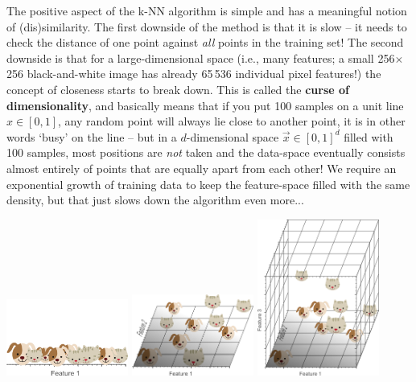 \documentclass{article}
\begin{document}
The positive aspect of the k-NN algorithm is simple and has a meaningful notion of (dis)similarity. The first downside of the method is that it is slow -- it needs to check the distance of one point against \textit{all} points in the training set! The second downside is that for a large-dimensional space (i.e., many features; a small 256$\times$256 black-and-white image has already 65\,536 individual pixel features!) the concept of closeness starts to break down. This is called the \textbf{curse of dimensionality}, and basically means that if you put 100 samples on a unit line $x\in[0,1]$, any random point will always lie close to another point, it is in other words `busy' on the line -- but in a $d$-dimensional space $\vec{x}\in[0,1]^d$ filled with 100 samples, most positions are \textit{not} taken and the data-space eventually consists almost entirely of points that are equally apart from each other! We require an exponential growth of training data to keep the feature-space filled with the same density, but that just slows down the algorithm even more...
\begin{center}
    \includegraphics[width=0.3\textwidth]{1Dproblem.png}    \includegraphics[width=0.3\textwidth]{2Dproblem.png}    \includegraphics[width=0.3\textwidth]{3Dproblem.png}
\end{center}
\end{document}

